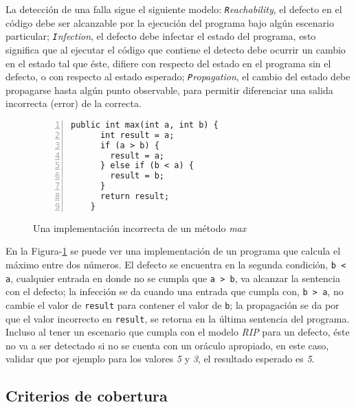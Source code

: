 La detecci\'on de una falla sigue el siguiente modelo: \emph{\texttt{R}eachability}, el defecto en el c\'odigo debe ser alcanzable por la ejecuci\'on del programa bajo alg\'un escenario particular; \emph{\texttt{I}nfection}, el defecto debe infectar el estado del programa, esto significa que al ejecutar el c\'odigo que contiene el detecto debe ocurrir un cambio en el estado tal que \'este, difiere con respecto del estado en el programa sin el defecto, o con respecto al estado esperado; \emph{\texttt{P}ropagation}, el cambio del estado debe propagarse hasta alg\'un punto observable, para permitir diferenciar una salida incorrecta (error) de la correcta.

\begin{figure}
	\begin{lstlisting}[frame=single,numbers=left, mathescape=true,framexleftmargin=1.5em]
    public int max(int a, int b) {
      int result = a;
      if (a > b) {
        result = a;
      } else if (b < a) {
        result = b;
      }
      return result;
    }
	\end{lstlisting}
	\caption{Una implementaci\'on incorrecta de un m\'etodo \emph{max}}
	\label{figures.examples.testing.rip}
\end{figure}

En la Figura-\ref{figures.examples.testing.rip} se puede ver una implementaci\'on de un programa que calcula el m\'aximo entre dos n\'umeros. El defecto se encuentra en la segunda condici\'on, \texttt{b < a}, cualquier entrada en donde no se cumpla que \texttt{a > b}, va alcanzar la sentencia con el defecto; la infecci\'on se da cuando una entrada que cumpla con, \texttt{b > a}, no cambie el valor de \texttt{result} para contener el valor de \texttt{b}; la propagaci\'on se da por que el valor incorrecto en \texttt{result}, se retorna en la \'ultima sentencia del programa. Incluso al tener un escenario que cumpla con el modelo \emph{RIP} para un defecto, \'este no va a ser detectado si no se cuenta con un or\'aculo apropiado, en este caso, validar que por ejemplo para los valores \emph{5} y \emph{3}, el resultado esperado es \emph{5}.

\subsection{Criterios de cobertura}
\label{sec:preliminares.testing.covcriteria}


